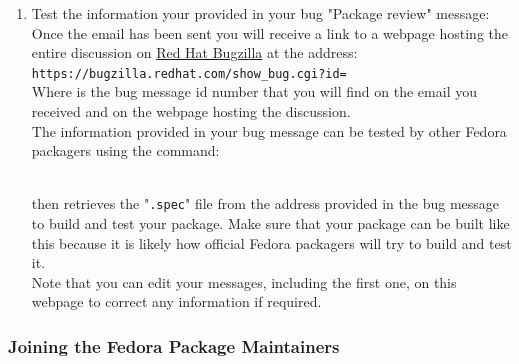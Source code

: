 \begin{enumerate}
\begin{itemize}
\begin{itemize}
\begin{itemize}
\item Describe the interest of the program for the community.
\end{itemize}
\end{itemize}
\end{itemize}
\newpage
\item Test the information your provided in your bug "Package review" message: \\[0.25cm]
Once the email has been sent you will receive a link to a webpage hosting the entire discussion on \href{https://bugzilla.redhat.com}{Red Hat Bugzilla} at the address: \\[0.25cm]
\texttt{https://bugzilla.redhat.com/show\_bug.cgi?id=} \\[0.25cm]
\noindent Where  is the bug message id number that you will find on the email you received and on the webpage hosting the discussion. \\
The information provided in your bug message can be tested by other Fedora packagers using the  command: 
\begin{scripti}
\fprompt{~}   
\end{scripti}
\\[-0.75cm]
\noindent {} then retrieves the "\texttt{.spec}" file from the address provided in the bug message to build and test your package. 
Make sure that your package can be built like this because it is likely how official Fedora packagers will try to build and test it. \\
Note that you can edit your messages, including the first one, on this webpage to correct any information if required. 
\end{enumerate}

\subsubsection{Joining the Fedora Package Maintainers}

